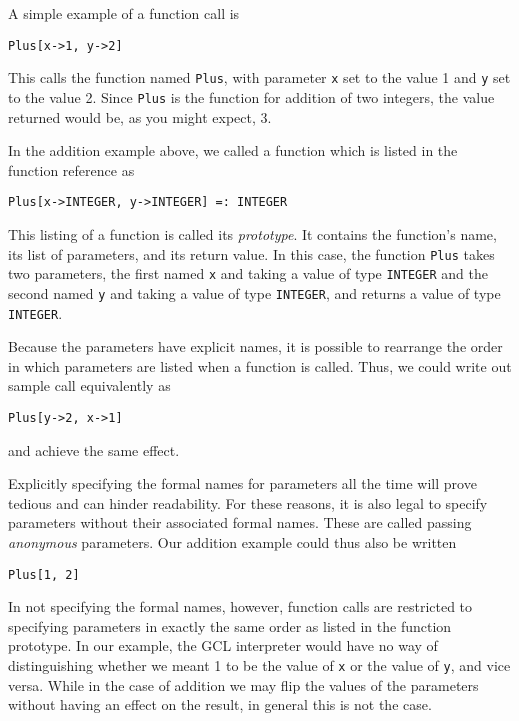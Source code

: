 A simple example of a function call is

\begin{verbatim}
Plus[x->1, y->2]
\end{verbatim}

This calls the function named {\tt Plus}, with parameter \verb+x+ set
to the value 1 and \verb+y+ set to the value 2.  Since {\tt Plus} is
the function for addition of two integers, the value returned would
be, as you might expect, 3.

In the addition example above, we called a function which is listed in
the function reference as

\begin{verbatim}
Plus[x->INTEGER, y->INTEGER] =: INTEGER
\end{verbatim}

\noindent This listing of a function is called its {\it prototype}.  
It contains the function's name, its list of parameters, and its return
value.  In this case, the function {\tt Plus} takes two parameters, the
first named \verb+x+ and taking a value of type {\tt INTEGER} and the
second named \verb+y+ and taking a value of type {\tt INTEGER}, and
returns a value of type {\tt INTEGER}.

Because the parameters have explicit names, it is possible to rearrange
the order in which parameters are listed when a function is called.
Thus, we could write out sample call equivalently as

\begin{verbatim}
Plus[y->2, x->1]
\end{verbatim}

\noindent and achieve the same effect.

Explicitly specifying the formal names for parameters all the time
will prove tedious and can hinder readability.  For these reasons, it is
also legal to specify parameters without their associated formal names.
These are called passing {\it anonymous} parameters.  Our addition
example could thus also be written

\begin{verbatim}
Plus[1, 2]
\end{verbatim}

In not specifying the formal names, however, function calls are restricted
to specifying parameters in exactly the same order as listed in the function
prototype.  In our example, the GCL interpreter would have no way of
distinguishing whether we meant 1 to be the value of \verb+x+ or the
value of \verb+y+, and vice versa.  While in the case of addition we may
flip the values of the parameters without having an effect on the result,
in general this is not the case.

